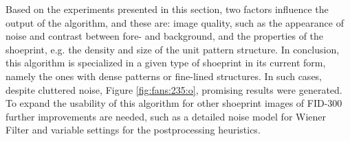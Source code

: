 \documentclass[draft,final]{vutinfth} %
\begin{document}
\par
Based on the experiments presented in this section, two factors influence the output of the algorithm, and these are: image quality, such as the appearance of noise and contrast between fore- and background, and the properties of the shoeprint, e.g. the density and size of the unit pattern structure.
In conclusion, this algorithm is specialized in a given type of shoeprint in its current form, namely the ones with dense patterns or fine-lined structures. 
In such cases, despite cluttered noise, Figure \ref{fig:fans:235:o}, promising results were generated.
To expand the usability of this algorithm for other shoeprint images of FID-300 further improvements are needed, such as a detailed noise model for Wiener Filter and variable settings for the postprocessing heuristics. 
\end{document}
